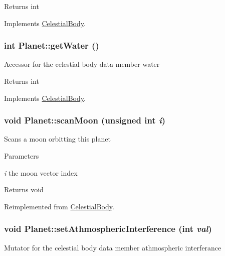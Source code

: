 \begin{DoxyReturn}{Returns}
int 
\end{DoxyReturn}


Implements \hyperlink{classCelestialBody}{CelestialBody}.

\hypertarget{classPlanet_af5bc4d184fcb72bd37f70119af5ecd89}{
\subsubsection[{getWater}]{\setlength{\rightskip}{0pt plus 5cm}int Planet::getWater ()}}
\label{d5/dec/classPlanet_af5bc4d184fcb72bd37f70119af5ecd89}
Accessor for the celestial body data member water

\begin{DoxyReturn}{Returns}
int 
\end{DoxyReturn}


Implements \hyperlink{classCelestialBody}{CelestialBody}.

\hypertarget{classPlanet_ad039e19380947fbf2695d78d4059f1db}{
\subsubsection[{scanMoon}]{\setlength{\rightskip}{0pt plus 5cm}void Planet::scanMoon (unsigned int {\em i})}}
\label{d5/dec/classPlanet_ad039e19380947fbf2695d78d4059f1db}
Scans a moon orbitting this planet


\begin{DoxyParams}{Parameters}
\item[{\em i}]the moon vector index\end{DoxyParams}
\begin{DoxyReturn}{Returns}
void 
\end{DoxyReturn}


Reimplemented from \hyperlink{classCelestialBody_a6e7b86fa71d74ad29e2434c4715b5608}{CelestialBody}.

\hypertarget{classPlanet_a8f00e39da016ecdca4d1f0e7e8a76f5d}{
\subsubsection[{setAthmosphericInterference}]{\setlength{\rightskip}{0pt plus 5cm}void Planet::setAthmosphericInterference (int {\em val})}}
\label{d5/dec/classPlanet_a8f00e39da016ecdca4d1f0e7e8a76f5d}
Mutator for the celestial body data member athmospheric interferance


